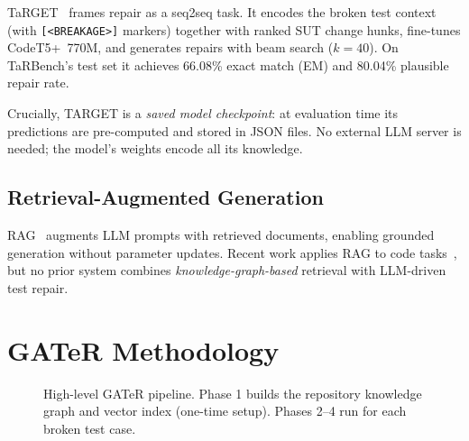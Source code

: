 \documentclass[conference,10pt]{IEEEtran}
\begin{document}
TaRGET~\cite{target2024} frames repair as a seq2seq task. It encodes
the broken test context (with \texttt{[<BREAKAGE>]} markers) together
with ranked SUT change hunks, fine-tunes CodeT5+~770M, and generates
repairs with beam search ($k{=}40$). On TaRBench's test set it
achieves 66.08\% exact match (EM) and 80.04\% plausible repair rate.

Crucially, TARGET is a \emph{saved model checkpoint}: at evaluation
time its predictions are pre-computed and stored in JSON files.
No external LLM server is needed; the model's weights encode all its
knowledge.

\subsection{Retrieval-Augmented Generation}

RAG~\cite{lewis2020rag} augments LLM prompts with retrieved documents,
enabling grounded generation without parameter updates. Recent work
applies RAG to code tasks~\cite{zhang2023repocoder}, but no prior system
combines \emph{knowledge-graph-based} retrieval with LLM-driven test
repair.

\section{GATeR Methodology}
\label{sec:methodology}

\begin{figure}[t]
\centering
{}
\caption{High-level GATeR pipeline. Phase 1 builds the repository
knowledge graph and vector index (one-time setup). Phases 2--4 run for
each broken test case.}
\label{fig:pipeline}
\end{figure}
\end{document}

